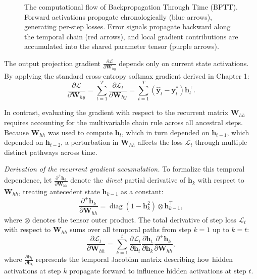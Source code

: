 \documentclass[../../main.tex]{subfiles}
\begin{document}
\begin{figure}[htbp]
\caption{The computational flow of Backpropagation Through Time (BPTT). Forward activations propagate chronologically (blue arrows), generating per-step losses. Error signals propagate backward along the temporal chain (red arrows), and local gradient contributions are accumulated into the shared parameter tensor (purple arrows).}
\label{fig:rnn_bptt_flow}
\end{figure}

The output projection gradient $\frac{\partial \mathcal{L}}{\partial \mathbf{W}_{hy}}$ depends only on current state activations. By applying the standard cross-entropy softmax gradient derived in Chapter 1:
\begin{equation}
\frac{\partial \mathcal{L}}{\partial \mathbf{W}_{hy}} = \sum_{t=1}^T \frac{\partial \mathcal{L}_t}{\partial \mathbf{W}_{hy}} = \sum_{t=1}^T \left(\hat{\mathbf{y}}_t - \mathbf{y}_t^*\right) \mathbf{h}_t^\top.
\label{eq:bptt_why}
\end{equation}

In contrast, evaluating the gradient with respect to the recurrent matrix $\mathbf{W}_{hh}$ requires accounting for the multivariable chain rule across all ancestral steps. Because $\mathbf{W}_{hh}$ was used to compute $\mathbf{h}_t$, which in turn depended on $\mathbf{h}_{t-1}$, which depended on $\mathbf{h}_{t-2}$, a perturbation in $\mathbf{W}_{hh}$ affects the loss $\mathcal{L}_t$ through multiple distinct pathways across time.

\textit{Derivation of the recurrent gradient accumulation.} To formalize this temporal dependence, let $\frac{\partial^+ \mathbf{h}_k}{\partial \mathbf{W}_{hh}}$ denote the \textit{direct} partial derivative of $\mathbf{h}_k$ with respect to $\mathbf{W}_{hh}$, treating antecedent state $\mathbf{h}_{k-1}$ as a constant:
\begin{equation}
\frac{\partial^+ \mathbf{h}_k}{\partial \mathbf{W}_{hh}} = \operatorname{diag}\left(1 - \mathbf{h}_k^2\right) \otimes \mathbf{h}_{k-1}^\top,
\label{eq:direct_derivative_whh}
\end{equation}
where $\otimes$ denotes the tensor outer product. The total derivative of step loss $\mathcal{L}_t$ with respect to $\mathbf{W}_{hh}$ sums over all temporal paths from step $k=1$ up to $k=t$:
\begin{equation}
\frac{\partial \mathcal{L}_t}{\partial \mathbf{W}_{hh}} = \sum_{k=1}^t \frac{\partial \mathcal{L}_t}{\partial \mathbf{h}_t} \frac{\partial \mathbf{h}_t}{\partial \mathbf{h}_k} \frac{\partial^+ \mathbf{h}_k}{\partial \mathbf{W}_{hh}},
\label{eq:step_loss_whh}
\end{equation}
where $\frac{\partial \mathbf{h}_t}{\partial \mathbf{h}_k}$ represents the temporal Jacobian matrix describing how hidden activations at step $k$ propagate forward to influence hidden activations at step $t$.
\end{document}
